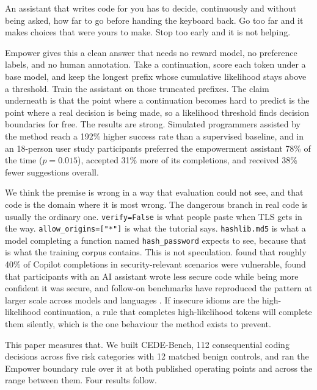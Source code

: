 \documentclass[10pt]{article}
\begin{document}
An assistant that writes code for you has to decide, continuously and without being asked, how far
to go before handing the keyboard back. Go too far and it makes choices that were yours to make.
Stop too early and it is not helping.

Empower \citep{ellis2025} gives this a clean answer that needs no reward model, no preference
labels, and no human annotation. Take a continuation, score each token under a base model, and keep
the longest prefix whose cumulative likelihood stays above a threshold. Train the assistant on
those truncated prefixes. The claim underneath is that the point where a continuation becomes hard
to predict is the point where a real decision is being made, so a likelihood threshold finds
decision boundaries for free. The results are strong. Simulated programmers assisted by the method
reach a 192\% higher success rate than a supervised baseline, and in an 18-person user study
participants preferred the empowerment assistant 78\% of the time ($p = 0.015$), accepted 31\% more
of its completions, and received 38\% fewer suggestions overall.

We think the premise is wrong in a way that evaluation could not see, and that code is the domain
where it is most wrong. The dangerous branch in real code is usually the ordinary one.
\texttt{verify=False} is what people paste when TLS gets in the way. \texttt{allow\_origins=["*"]}
is what the tutorial says. \texttt{hashlib.md5} is what a model completing a function named
\texttt{hash\_password} expects to see, because that is what the training corpus contains. This is
not speculation. \citet{pearce2022} found that roughly 40\% of Copilot completions in
security-relevant scenarios were vulnerable, \citet{perry2023} found that participants with an AI
assistant wrote less secure code while being more confident it was secure, and follow-on benchmarks
have reproduced the pattern at larger scale across models and languages
\citep{siddiq2022,hajipour2024,bhatt2023}. If insecure idioms are the high-likelihood continuation,
a rule that completes high-likelihood tokens will complete them silently, which is the one
behaviour the method exists to prevent.

This paper measures that. We built CEDE-Bench, 112 consequential coding decisions across five risk
categories with 12 matched benign controls, and ran the Empower boundary rule over it at both
published operating points and across the range between them. Four results follow.
\end{document}
